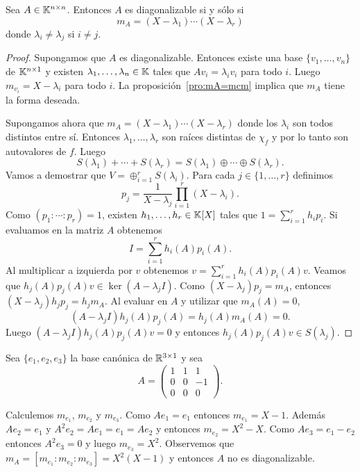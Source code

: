 \begin{prop}
	\label{pro:minimal_diagonalizable}
	Sea $A\in\mathbb{K}^{n\times n}$. Entonces $A$ es diagonalizable si y sólo si 
	\[
		m_A=(X-\lambda_1)\cdots(X-\lambda_r) 
	\]
	donde $\lambda_i\ne\lambda_j$ si $i\ne j$. 

	\begin{proof}
		Supongamos que $A$ es diagonalizable. Entonces existe una base
		$\{v_1,\dots,v_n\}$ de $\mathbb{K}^{n\times1}$ y existen
		$\lambda_1,\dots,\lambda_n\in\mathbb{K}$ tales que $Av_i=\lambda_i v_i$ para
		todo $i$. Luego $m_{v_i}=X-\lambda_i$ para todo $i$. La
		proposición~\ref{pro:mA=mcm} implica que $m_A$ tiene la forma deseada. 

		Supongamos ahora que $m_A=(X-\lambda_1)\cdots(X-\lambda_r)$ donde los
		$\lambda_i$ son todos distintos entre sí.  Entonces
		$\lambda_1,\dots,\lambda_r$ son raíces distintas de $\chi_f$ y por lo
		tanto son autovalores de $f$. Luego 
		\[
			S(\lambda_1)+\cdots+S(\lambda_r)=S(\lambda_1)\oplus\cdots\oplus S(\lambda_r).
		\]
		Vamos a demostrar que $V=\oplus_{i=1}^r S(\lambda_i)$. Para cada $j\in\{1,\dots,r\}$ definimos
		\[
			p_j=\frac{1}{X-\lambda_j}\prod_{i=1}^r(X-\lambda_i).
		\]
		Como $(p_1:\cdots:p_r)=1$, existen $h_1,\dots,h_r\in\mathbb{K}[X]$ tales que
		$1=\sum_{i=1}^rh_ip_i$. Si evaluamos en la matriz $A$ obtenemos
		\[
			I=\sum_{i=1}^r h_i(A) p_i(A).
		\]
		Al multiplicar a izquierda por $v$ obtenemos $v=\sum_{i=1}^r h_i(A)p_i(A)v$.
		Veamos que $h_j(A)p_j(A)v\in\ker(A-\lambda_jI)$. Como $(X-\lambda_j)p_j=m_A$, entonces 
		$(X-\lambda_j)h_jp_j=h_jm_A$. Al evaluar en $A$ y utilizar que $m_A(A)=0$, 
		\[
			(A-\lambda_jI)h_j(A)p_j(A)=h_j(A)m_A(A)=0.
		\]
		Luego $(A-\lambda_jI)h_j(A)p_j(A)v=0$ y entonces $h_j(A)p_j(A)v\in
		S(\lambda_j)$.
	\end{proof}
\end{prop}

\begin{example}
	Sea $\{e_1,e_2,e_3\}$ la base canónica de $\mathbb{R}^{3\times1}$ y sea
	\[
		A=\begin{pmatrix}
			1 & 1 & 1\\
			0 & 0 & -1\\
			0 & 0 & 0
		\end{pmatrix}.
	\]

	Calculemos $m_{e_1}$, $m_{e_2}$ y $m_{e_3}$. Como $Ae_1=e_1$ entonces
	$m_{e_1}=X-1$. Además $Ae_2=e_1$ y $A^2e_2=Ae_1=e_1=Ae_2$ y entonces
	$m_{e_2}=X^2-X$. Como $Ae_3=e_1-e_2$ entonces $A^2e_3=0$ y luego
	$m_{e_3}=X^2$. Observemos que $m_A=[m_{e_1}:m_{e_2}:m_{e_3}]=X^2(X-1)$ y
	entonces $A$ no es diagonalizable.
\end{example}

